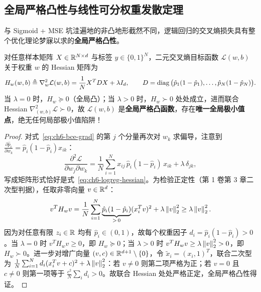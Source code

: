 \subsection{全局严格凸性与线性可分权重发散定理}
\label{subsec:ch6-convex-diverge}

与 Sigmoid + MSE 坑洼遍地的非凸地形截然不同，逻辑回归的交叉熵损失具有整个优化理论梦寐以求的\textbf{全局严格凸性}。

\begin{thmBox}
\begin{theorem}[带 $L_2$ 正则化逻辑回归的全局严格凸性]
\label{thm:ch6-logreg-convex}
对任意样本矩阵 $X \in \mathbb{R}^{N\times d}$ 与标签 $y \in \{0,1\}^N$，二元交叉熵目标函数 $\mathcal{L}(w, b)$ 关于权重 $w$ 的 Hessian 矩阵为
\begin{equation}
  H_w(w, b) \triangleq \nabla_w^2 \mathcal{L}(w, b) = \frac{1}{N} X^T D X + \lambda I_d,
  \qquad
  D = \operatorname{diag}\big(\hat{p}_1(1-\hat{p}_1), \dots, \hat{p}_N(1-\hat{p}_N)\big).
  \label{eq:ch6-logreg-hessian}
\end{equation}
当 $\lambda = 0$ 时，$H_w \succeq 0$（全局凸）；当 $\lambda > 0$ 时，$H_w \succ 0$ 处处成立，进而联合 Hessian $\nabla_{(w,b)}^2 \mathcal{L} \succ 0$，故 $\mathcal{L}(w, b)$ 是\textbf{全局严格凸函数}，存在\textbf{唯一全局极小值点}，绝无任何局部极小值陷阱！
\end{theorem}
\end{thmBox}

\begin{proof}
对式~\eqref{eq:ch6-bce-grad} 的第 $j$ 个分量再次对 $w_k$ 求偏导，注意到 $\frac{\partial \hat{p}_i}{\partial w_k} = \hat{p}_i(1-\hat{p}_i) x_{ik}$：
\[
  \frac{\partial^2 \mathcal{L}}{\partial w_j \partial w_k}
  = \frac{1}{N}\sum_{i=1}^N x_{ij}\, \hat{p}_i(1-\hat{p}_i)\, x_{ik} + \lambda\,\delta_{jk},
\]
写成矩阵形式恰好是式~\eqref{eq:ch6-logreg-hessian}。为检验正定性（第 1 卷第 3 章二次型判据），任取非零向量 $v \in \mathbb{R}^d$：
\[
  v^T H_w v
  = \frac{1}{N}\sum_{i=1}^N \underbrace{\hat{p}_i(1-\hat{p}_i)}_{>\,0}(x_i^T v)^2 + \lambda\left\|v\right\|_2^2
  \ge \lambda\left\|v\right\|_2^2.
\]
因为对任意有限 $z_i \in \mathbb{R}$ 均有 $\hat{p}_i \in (0,1)$，故每个权重因子 $d_i = \hat{p}_i(1-\hat{p}_i) > 0$。当 $\lambda = 0$ 时 $v^T H_w v \ge 0$，即 $H_w \succeq 0$；当 $\lambda > 0$ 时 $v^T H_w v \ge \lambda\left\|v\right\|_2^2 > 0$，即 $H_w \succ 0$。进一步对增广向量 $(v, c) \in \mathbb{R}^{d+1} \setminus \{0\}$，令 $\tilde{x}_i = (x_i, 1)^T$，联合二次型为 $\frac{1}{N}\sum_{i=1}^N d_i (x_i^T v + c)^2 + \lambda\left\|v\right\|_2^2$：若 $v \neq 0$ 则第二项严格为正；若 $v = 0$ 且 $c \neq 0$ 则第一项等于 $\frac{c^2}{N}\sum_i d_i > 0$。故联合 Hessian 处处严格正定，全局严格凸性得证。
\end{proof}

